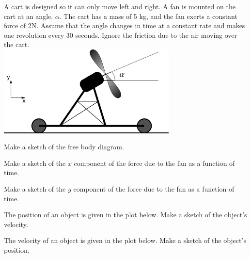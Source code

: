 \begin{problem}
\item A cart is designed so it can only move left and right. A fan is
  mounted on the cart at an angle, $\alpha$. The cart has a mass of 5
  kg, and the fan exerts a constant force of 2N. Assume that the angle
  changes in time at a constant rate and makes one revolution every 30
  seconds. Ignore the friction due to the air moving
  over the cart.  \\
  \includegraphics[width=9cm]{ink/week6/airCart}
  \begin{subproblem}
    \item Make a sketch of the free body diagram.
      \vspace{10em}
    \item Make a sketch of the $x$ component of the force due to the
      fan as a function of time.
      \vfill
    \item Make a sketch of the $y$ component of the force due to the
      fan as a function of time.
      \vfill
      \clearpage
    \item The position of an object is given in the plot below. Make
      a sketch of the object's velocity. \\
      \scalebox{0.65}{}

    \item The velocity of an object is given in the plot below. Make
      a sketch of the object's position. \\
      \scalebox{0.65}{}

  \end{subproblem}

  \clearpage


\end{problem}
